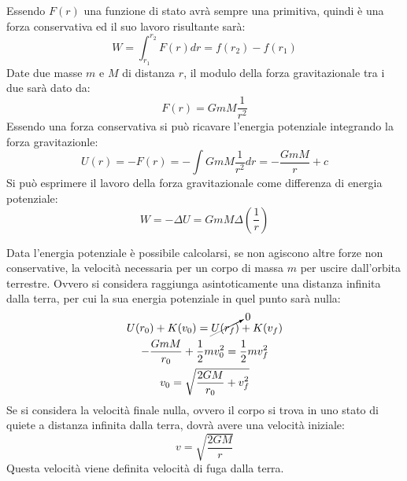 \documentclass{article}
\numberwithin{equation}{subsection}
\begin{document}
Essendo $F(r)$ una funzione di stato avrà sempre una primitiva, quindi è una forza conservativa ed il suo lavoro risultante sarà:
\begin{equation*}
    W=\displaystyle\int_{r_1}^{r_2}F(r)dr=f(r_2)-f(r_1)
\end{equation*}
Date due masse $m$ e $M$ di distanza $r$, il modulo della forza gravitazionale tra i due sarà dato da:  
\begin{equation}
    F(r)=GmM\displaystyle\frac{1}{r^2}
\end{equation}
Essendo una forza conservativa si può ricavare l'energia potenziale integrando la forza gravitazionle:
\begin{equation}
    U(r)=-F(r)=\displaystyle-\int GmM\frac{1}{r^2}dr=-\frac{GmM}{r}+c
\end{equation}
Si può esprimere il lavoro della forza gravitazionale come differenza di energia potenziale:
\begin{equation}
    W=-\Delta U=GmM\Delta\left(\displaystyle\frac{1}{r}\right)
\end{equation}

Data l'energia potenziale è possibile calcolarsi, se non agiscono altre forze non conservative, la velocità necessaria per un corpo di 
massa $m$ per uscire dall'orbita terrestre. Ovvero si considera raggiunga asintoticamente una distanza infinita dalla terra, per 
cui la sua energia potenziale in quel punto sarà nulla:
\begin{gather*}
    U(r_0)+K(v_0)=\cancelto{0}{U(r_f)}+K(v_f)\\
    -\displaystyle\frac{GmM}{r_0}+\frac{1}{2}mv_0^2=\frac{1}{2}mv_f^2\\
    v_0=\displaystyle\sqrt{\displaystyle\frac{2GM}{r_0}+v_f^2}
\end{gather*}
Se si considera la velocità finale nulla, ovvero il corpo si trova in uno stato di quiete a distanza infinita dalla terra, dovrà avere 
una velocità iniziale:
\begin{equation}
    v=\displaystyle\sqrt{\frac{2GM}{r}}
\end{equation}
Questa velocità viene definita velocità di fuga dalla terra. 
\end{document}
